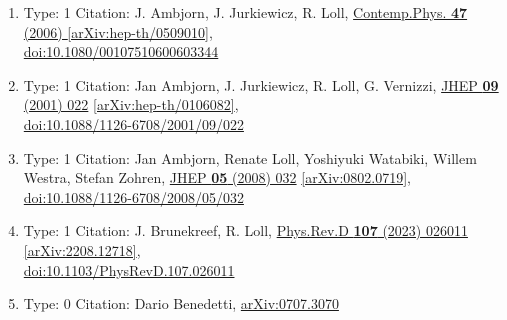 \documentclass[a4paper,10pt]{article}
\begin{document}
\begin{enumerate}
\begin{enumerate}
  \item Type: 1 Citation: J. Ambjorn, J. Jurkiewicz, R. Loll, \href{https://www.doi.org/10.1080/00107510600603344}{Contemp.Phys. {\bf 47} (2006) }  \href{https://arxiv.org/abs/hep-th/0509010}{[arXiv:hep-th/0509010]},\\\href{https://www.doi.org/10.1080/00107510600603344}{doi:10.1080/00107510600603344}
  \item Type: 1 Citation: Jan Ambjorn, J. Jurkiewicz, R. Loll, G. Vernizzi, \href{https://www.doi.org/10.1088/1126-6708/2001/09/022}{JHEP {\bf 09} (2001) 022}  \href{https://arxiv.org/abs/hep-th/0106082}{[arXiv:hep-th/0106082]},\\\href{https://www.doi.org/10.1088/1126-6708/2001/09/022}{doi:10.1088/1126-6708/2001/09/022}
  \item Type: 1 Citation: Jan Ambjorn, Renate Loll, Yoshiyuki Watabiki, Willem Westra, Stefan Zohren, \href{https://www.doi.org/10.1088/1126-6708/2008/05/032}{JHEP {\bf 05} (2008) 032}  \href{https://arxiv.org/abs/0802.0719}{[arXiv:0802.0719]},\\\href{https://www.doi.org/10.1088/1126-6708/2008/05/032}{doi:10.1088/1126-6708/2008/05/032}
  \item Type: 1 Citation: J. Brunekreef, R. Loll, \href{https://www.doi.org/10.1103/PhysRevD.107.026011}{Phys.Rev.D {\bf 107} (2023) 026011}  \href{https://arxiv.org/abs/2208.12718}{[arXiv:2208.12718]},\\\href{https://www.doi.org/10.1103/PhysRevD.107.026011}{doi:10.1103/PhysRevD.107.026011}
  \item Type: 0 Citation: Dario Benedetti, \href{https://arxiv.org/abs/0707.3070}{arXiv:0707.3070}

\end{enumerate}
\end{enumerate}
\end{document}
